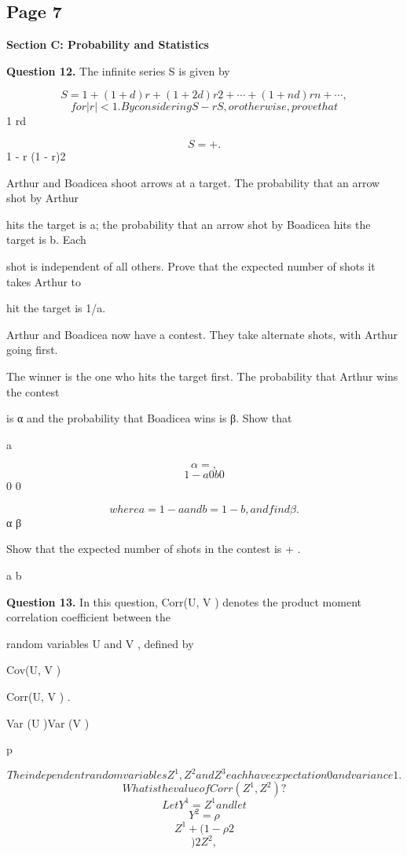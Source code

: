 \documentclass[12pt]{article}
\begin{document}
\subsection*{Page 7}
\begin{flushleft}
\bigskip\textbf{Section C: Probability and Statistics}\par
\bigskip\textbf{Question 12.} The infinite series S is given by\par
\[S = 1 + (1 + d)r + (1 + 2d)r 2 + \cdots + (1 + nd)rn + \cdots ,\]
\[for |r| < 1 . By considering S - rS, or otherwise, prove that\]
1 rd\par
\[S = + .\]
1 - r (1 - r)2\par
Arthur and Boadicea shoot arrows at a target. The probability that an arrow shot by Arthur\par
hits the target is a; the probability that an arrow shot by Boadicea hits the target is b. Each\par
shot is independent of all others. Prove that the expected number of shots it takes Arthur to\par
hit the target is 1/a.\par
Arthur and Boadicea now have a contest. They take alternate shots, with Arthur going first.\par
The winner is the one who hits the target first. The probability that Arthur wins the contest\par
is α and the probability that Boadicea wins is β. Show that\par
a\par
\[α = ,\]
\[1 - a0b0\]
0 0\par
\[where a = 1 - a and b = 1 - b, and find β.\]
α β\par
Show that the expected number of shots in the contest is + .\par
a b\par
\bigskip\textbf{Question 13.} In this question, Corr(U, V ) denotes the product moment correlation coefficient between the\par
random variables U and V , defined by\par
Cov(U, V )\par
Corr(U, V ) \equiv .\par
Var (U )Var (V )\par
p\par
\[The independent random variables Z^1, Z^2 and Z^3 each have expectation 0 and variance 1.\]
\[What is the value of Corr(Z^1, Z^2)?\]
\[Let Y^1 = Z^1 and let\]
\[Y^2 = ρ\]
\[Z^1 + (1 - ρ 2\]
\[)2 Z^2 ,\]

\end{flushleft}
\end{document}

